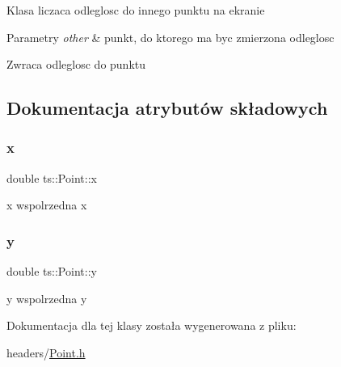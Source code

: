 Klasa liczaca odleglosc do innego punktu na ekranie


\begin{DoxyParams}{Parametry}
{\em other} & punkt, do ktorego ma byc zmierzona odleglosc \\
\hline
\end{DoxyParams}
\begin{DoxyReturn}{Zwraca}
odleglosc do punktu 
\end{DoxyReturn}


\subsection{Dokumentacja atrybutów składowych}
\mbox{\label{classts_1_1_point_ad726f45d332a723ab835926fec22e8b3}} 
\subsubsection{\texorpdfstring{x}{x}}
{\footnotesize\ttfamily double ts\+::\+Point\+::x}

x wspolrzedna x \mbox{\label{classts_1_1_point_aebe1d290b7b7dac45ac36a42157e5678}} 
\subsubsection{\texorpdfstring{y}{y}}
{\footnotesize\ttfamily double ts\+::\+Point\+::y}

y wspolrzedna y 

Dokumentacja dla tej klasy została wygenerowana z pliku\+:\begin{DoxyCompactItemize}
\item 
headers/\mbox{\hyperlink{_point_8h}{Point.\+h}}\end{DoxyCompactItemize}
